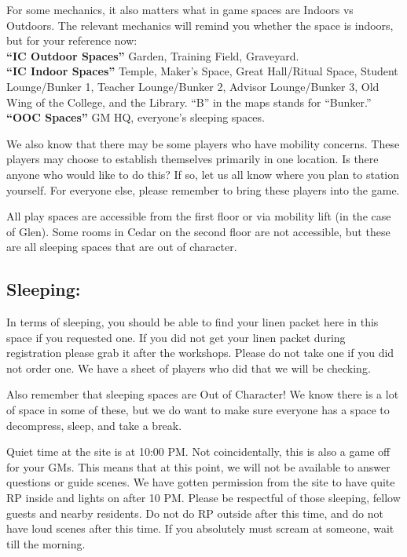 \documentclass[green]{GL2020}
\begin{document}
For some mechanics, it also matters what in game spaces are Indoors vs Outdoors. The relevant mechanics will remind you whether the space is indoors, but for your reference now: \\
\textbf{``IC Outdoor Spaces''} Garden, Training Field, Graveyard. \\
\textbf{``IC Indoor Spaces''} Temple, Maker's Space, Great Hall/Ritual Space, Student Lounge/Bunker 1, Teacher Lounge/Bunker 2, Advisor Lounge/Bunker 3, Old Wing of the College, and the Library. ``B'' in the maps stands for ``Bunker.''\\
\textbf{``OOC Spaces''} GM HQ, everyone's sleeping spaces.

We also know that there may be some players who have mobility concerns.  These players may choose to establish themselves primarily in one location.  Is there anyone who would like to do this? If so, let us all know where you plan to station yourself. For everyone else, please remember to bring these players into the game.

All play spaces are accessible from the first floor or via mobility lift (in the case of Glen).  Some rooms in Cedar on the second floor are not accessible, but these are all sleeping spaces that are out of character.

\subsection*{Sleeping:}

In terms of sleeping, you should be able to find your linen packet here in this space if you requested one.  If you did not get your linen packet during registration please grab it after the workshops.  Please do not take one if you did not order one.  We have a sheet of players who did that we will be checking.  

Also remember that sleeping spaces are Out of Character!  We know there is a lot of space in some of these, but we do want to make sure everyone has a space to decompress, sleep, and take a break.

Quiet time at the site is at 10:00 PM.  Not coincidentally, this is also a game off for your GMs. This means that at this point, we will not be available to answer questions or guide scenes.  We have gotten permission from the site to have quite RP inside and lights on after 10 PM.  Please be respectful of those sleeping, fellow guests and nearby residents.  Do not do RP outside after this time, and do not have loud scenes after this time. If you absolutely must scream at someone, wait till the morning.
\end{document}
